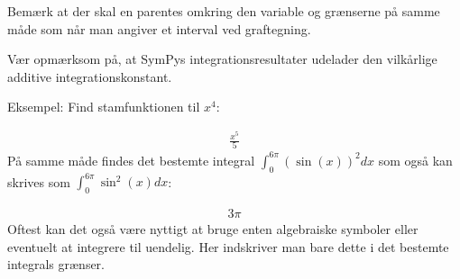 \documentclass[letterpaper,10pt,english]{jupyterBook}
\begin{document}
\begin{sphinxVerbatim}[commandchars=\\\{\}]
   
\end{sphinxVerbatim}

Bemærk at der skal en parentes omkring den variable og grænserne på samme måde som når man angiver et interval ved graftegning.

Vær opmærksom på, at SymPys integrationsresultater udelader den vilkårlige additive integrationskonstant.

Eksempel: Find stamfunktionen til \(x^4\):

\begin{sphinxVerbatim}[commandchars=\\\{\}]
                                   
      
                  
\end{sphinxVerbatim}
\begin{equation*}
\begin{split}\displaystyle \frac{x^{5}}{5}\end{split}
\end{equation*}
På samme måde findes det bestemte integral \(\int_0^{6\pi}(\sin(x))^2dx\) som også kan skrives som \(\int_0^{6\pi}\sin^2(x)dx\):

\begin{sphinxVerbatim}[commandchars=\\\{\}]
                     
         
\end{sphinxVerbatim}
\begin{equation*}
\begin{split}\displaystyle 3 \pi\end{split}
\end{equation*}
Oftest kan det også være nyttigt at bruge enten algebraiske symboler eller eventuelt at integrere til uendelig. Her indskriver man bare dette i det bestemte integrals grænser.
\end{document}
